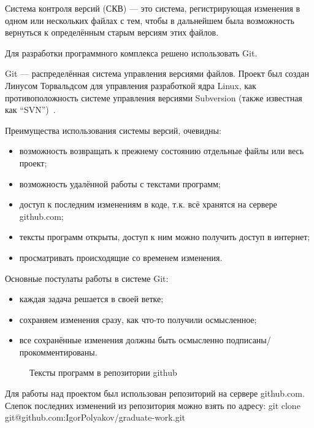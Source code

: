 Система контроля версий (СКВ) — это система, регистрирующая изменения в одном или нескольких файлах с тем, чтобы в дальнейшем была возможность вернуться к определённым старым версиям этих файлов.

Для разработки программного комплекса решено использовать Git.

Git  — распределённая система управления версиями файлов. Проект был создан Линусом Торвальдсом для управления разработкой ядра Linux, как противоположность системе управления версиями Subversion (также известная как ``SVN'')~\cite{progit}.

Преимущества использования системы версий, очевидны:
\begin{itemize}
\item возможность возвращать к прежнему состоянию отдельные файлы или весь проект;
\item возможность удалённой работы с текстами программ;
\item доступ к последним изменениям в коде, т.к. всё хранятся на сервере github.com;
\item тексты программ открыты, доступ к ним можно получить доступ в интернет;
\item просматривать происходящие со временем изменения.
\end{itemize}

Основные постулаты работы в системе Git:
\begin{itemize}
\item каждая задача решается в своей ветке;
\item сохраняем изменения сразу, как что-то получили осмысленное;
\item все сохранённые изменения должны быть осмысленно подписаны/прокомментированы.
\end{itemize}
\begin{figure}[ht]
\caption{Тексты программ в репозитории github}
\label{pic:github}
\end{figure}

Для работы над проектом был использован репозиторий на сервере github.com. Слепок последних изменений из репозитория можно взять по адресу: git clone git@github.com:IgorPolyakov/graduate-work.git

